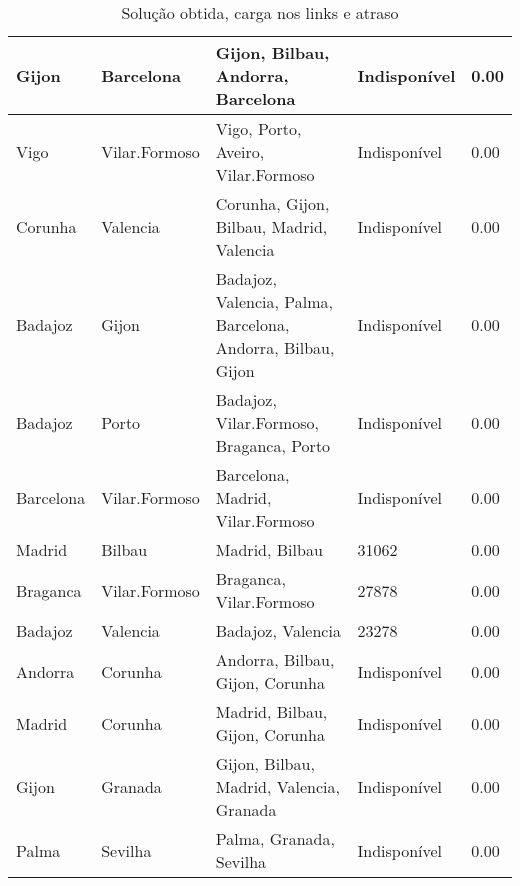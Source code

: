 \begin{table}[!htb]
{\begin{tabular}{|l|l|l|l|l|}
Gijon & Barcelona & Gijon, Bilbau, Andorra, Barcelona & Indisponível & 0.00 \\ \hline
Vigo & Vilar.Formoso & Vigo, Porto, Aveiro, Vilar.Formoso & Indisponível & 0.00 \\ \hline
Corunha & Valencia & Corunha, Gijon, Bilbau, Madrid, Valencia & Indisponível & 0.00 \\ \hline
Badajoz & Gijon & Badajoz, Valencia, Palma, Barcelona, Andorra, Bilbau, Gijon & Indisponível & 0.00 \\ \hline
Badajoz & Porto & Badajoz, Vilar.Formoso, Braganca, Porto & Indisponível & 0.00 \\ \hline
Barcelona & Vilar.Formoso & Barcelona, Madrid, Vilar.Formoso & Indisponível & 0.00 \\ \hline
Madrid & Bilbau & Madrid, Bilbau & 31062 & 0.00 \\ \hline
Braganca & Vilar.Formoso & Braganca, Vilar.Formoso & 27878 & 0.00 \\ \hline
Badajoz & Valencia & Badajoz, Valencia & 23278 & 0.00 \\ \hline
Andorra & Corunha & Andorra, Bilbau, Gijon, Corunha & Indisponível & 0.00 \\ \hline
Madrid & Corunha & Madrid, Bilbau, Gijon, Corunha & Indisponível & 0.00 \\ \hline
Gijon & Granada & Gijon, Bilbau, Madrid, Valencia, Granada & Indisponível & 0.00 \\ \hline
Palma & Sevilha & Palma, Granada, Sevilha & Indisponível & 0.00 \\ \hline
\end{tabular}}
\caption[]{Solução obtida, carga nos links e atraso}
\end{table}


